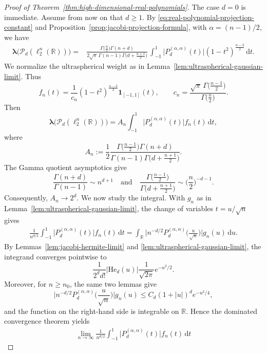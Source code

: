 \documentclass[11pt,showkeys]{amsart}
\begin{document}
\begin{proof}[Proof of Theorem~\ref{thm:high-dimensional-real-polynomials}]
The case $d=0$ is immediate. Assume from now on that $d\geq1$. By
\eqref{eq:real-polynomial-projection-constant} and
Proposition~\ref{prop:jacobi-projection-formula}, with
$\alpha=(n-1)/2$, we have
\[
\begin{split}
\boldsymbol\lambda\bigl(\mathcal P_d(\ell_2^n(\mathbb R))\bigr)
=&
\frac{
\Gamma\bigl(\frac n2\bigr)\Gamma(n+d)}
{2\sqrt{\pi}\,\Gamma(n-1)
\Gamma\bigl(d+\frac{n+1}{2}\bigr)}\,
\int_{-1}^{1}
\bigl|P_d^{(\alpha,\alpha)}(t)\bigr|
(1-t^2)^{\frac{n-3}{2}}
\,\mathrm{d} t.
\end{split}
\]
We normalize the ultraspherical weight as in
Lemma~\ref{lem:ultraspherical-gaussian-limit}. Thus
\[
f_n(t)
=
\frac{1}{c_n}
(1-t^2)^{\frac{n-3}{2}}
\mathbf 1_{[-1,1]}(t),
\qquad
c_n
=
\frac{
\sqrt{\pi}\,\Gamma\bigl(\frac{n-1}{2}\bigr)}
{\Gamma\bigl(\frac n2\bigr)}.
\]
Then
\[
\boldsymbol\lambda\bigl(\mathcal P_d(\ell_2^n(\mathbb R))\bigr)
=
A_n
\int_{-1}^{1}
\bigl|P_d^{(\alpha,\alpha)}(t)\bigr|
f_n(t)\,\mathrm{d} t,
\]
where
\[
A_n
:=
\frac12
\frac{
\Gamma\bigl(\frac{n-1}{2}\bigr)\Gamma(n+d)}
{\Gamma(n-1)
\Gamma\bigl(d+\frac{n+1}{2}\bigr)}.
\]
The Gamma quotient asymptotics give
\[
\frac{\Gamma(n+d)}{\Gamma(n-1)}
\sim n^{d+1} \quad \text{and} \quad
\frac{
\Gamma\bigl(\frac{n-1}{2}\bigr)}
{\Gamma\bigl(d+\frac{n+1}{2}\bigr)}
\sim
\bigg(\frac n2\bigg)^{-d-1}.
\]
Consequently,
\(
A_n\longrightarrow2^d.
\)
We now study the integral. With $g_n$ as in
Lemma~\ref{lem:ultraspherical-gaussian-limit}, the change of variables
$t=u/\sqrt n$ gives
\[
\begin{split}
\frac{1}{n^{d/2}}
\int_{-1}^{1}
\bigl|P_d^{(\alpha,\alpha)}(t)\bigr|
f_n(t)\,\mathrm{d} t
=
\int_{\mathbb R}
\bigg|
n^{-d/2}
P_d^{(\alpha,\alpha)}
\bigg(\frac{u}{\sqrt n}\bigg)
\bigg|
g_n(u)\,\mathrm{d} u.
\end{split}
\]
By Lemmas~\ref{lem:jacobi-hermite-limit} and
\ref{lem:ultraspherical-gaussian-limit}, the integrand converges pointwise to
\[
\frac{1}{2^d d!}
|\mathrm{He}_d(u)|
\frac{1}{\sqrt{2\pi}}e^{-u^2/2}.
\]
Moreover, for \(n\geq n_0\), the same two lemmas give
\[
\bigg|
n^{-d/2}
P_d^{(\alpha,\alpha)}
\bigg(\frac{u}{\sqrt n}\bigg)
\bigg|
g_n(u)
\leq
C_d(1+|u|)^d e^{-u^2/4},
\]
and the function on the right-hand side is integrable on $\mathbb R$. Hence
the dominated convergence theorem yields
\[
\begin{split}
\lim_{n\to\infty}
\frac{1}{n^{d/2}}
\int_{-1}^{1}
\bigl|P_d^{(\alpha,\alpha)}(t)\bigr|
f_n(t)\,\mathrm{d} t

\end{split}\]
\end{proof}
\end{document}
